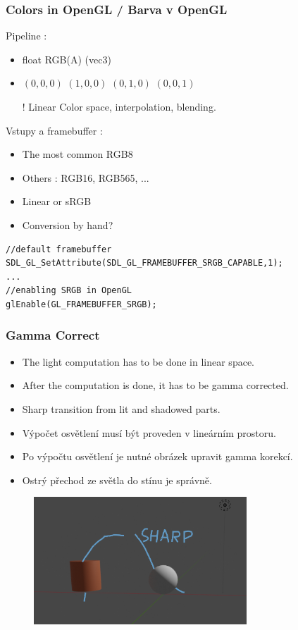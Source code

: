 \begin{frame}[fragile]
    \frametitle{Colors in OpenGL / Barva v OpenGL}

    Pipeline :
    \begin{itemize}
        \item float RGB(A) (vec3)
        \item {\color{black}$(0,0,0)$ \color{red}$(1,0,0)$ \color{green}$(0,1,0)$ \color{blue}$(0,0,1)$}
        \item[\color{red}!] Linear Color space, interpolation, blending.
    \end{itemize}
    \pause\vfill
    Vstupy a framebuffer :
    \begin{itemize}
        \item The most common RGB8
        \item Others : RGB16, RGB565, ...
        \item Linear or sRGB
        \item Conversion by hand?
    \end{itemize}
\begin{verbatim}
//default framebuffer
SDL_GL_SetAttribute(SDL_GL_FRAMEBUFFER_SRGB_CAPABLE,1);
...
//enabling SRGB in OpenGL
glEnable(GL_FRAMEBUFFER_SRGB);
\end{verbatim}
\end{frame}

\begin{frame}[fragile]
\frametitle{Gamma Correct}
  \scriptsize
	\begin{itemize}
  \item The light computation has to be done in linear space.
  \item After the computation is done, it has to be gamma corrected.
  \item Sharp transition from lit and shadowed parts.
	\end{itemize}
	\begin{itemize}
  \item Výpočet osvětlení musí být proveden v lineárním prostoru.
  \item Po výpočtu osvětlení je nutné obrázek upravit gamma korekcí.
  \item Ostrý přechod ze světla do stínu je správně.
	\end{itemize}
	\begin{figure}[h]
	\includegraphics[width=8cm,keepaspectratio]{pics/color/gamma_correct}
	\end{figure}
\end{frame}

